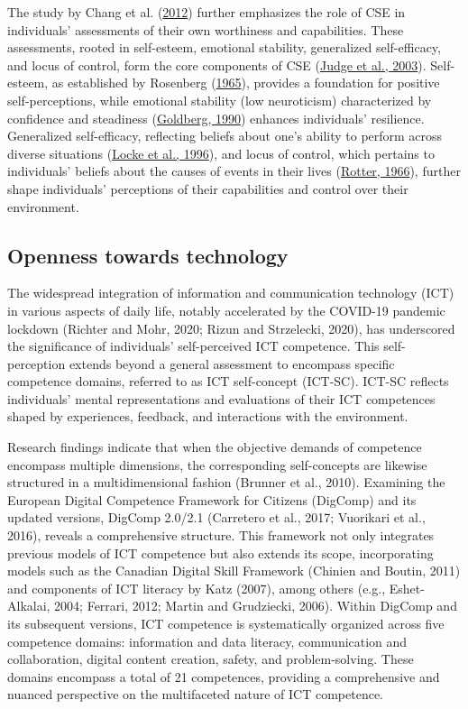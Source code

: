 \documentclass[
  12pt,
  a4paper,
  twoside]{article}
\begin{document}
The study by Chang et al. (\protect\hyperlink{ref-chang2012}{2012}) further emphasizes the role of CSE in individuals' assessments of their own worthiness and capabilities. These assessments, rooted in self-esteem, emotional stability, generalized self-efficacy, and locus of control, form the core components of CSE (\protect\hyperlink{ref-judge2003}{Judge et al., 2003}). Self-esteem, as established by Rosenberg (\protect\hyperlink{ref-rosenberg1965}{1965}), provides a foundation for positive self-perceptions, while emotional stability (low neuroticism) characterized by confidence and steadiness (\protect\hyperlink{ref-goldberg1990}{Goldberg, 1990}) enhances individuals' resilience. Generalized self-efficacy, reflecting beliefs about one's ability to perform across diverse situations (\protect\hyperlink{ref-locke1996}{Locke et al., 1996}), and locus of control, which pertains to individuals' beliefs about the causes of events in their lives (\protect\hyperlink{ref-rotter1966}{Rotter, 1966}), further shape individuals' perceptions of their capabilities and control over their environment.

\hypertarget{openness-towards-technology}{%
\subsection{Openness towards technology}\label{openness-towards-technology}}

The widespread integration of information and communication technology (ICT) in various aspects of daily life, notably accelerated by the COVID-19 pandemic lockdown (Richter and Mohr, 2020; Rizun and Strzelecki, 2020), has underscored the significance of individuals' self-perceived ICT competence. This self-perception extends beyond a general assessment to encompass specific competence domains, referred to as ICT self-concept (ICT-SC). ICT-SC reflects individuals' mental representations and evaluations of their ICT competences shaped by experiences, feedback, and interactions with the environment.

Research findings indicate that when the objective demands of competence encompass multiple dimensions, the corresponding self-concepts are likewise structured in a multidimensional fashion (Brunner et al., 2010). Examining the European Digital Competence Framework for Citizens (DigComp) and its updated versions, DigComp 2.0/2.1 (Carretero et al., 2017; Vuorikari et al., 2016), reveals a comprehensive structure. This framework not only integrates previous models of ICT competence but also extends its scope, incorporating models such as the Canadian Digital Skill Framework (Chinien and Boutin, 2011) and components of ICT literacy by Katz (2007), among others (e.g., Eshet-Alkalai, 2004; Ferrari, 2012; Martin and Grudziecki, 2006).
Within DigComp and its subsequent versions, ICT competence is systematically organized across five competence domains: information and data literacy, communication and collaboration, digital content creation, safety, and problem-solving. These domains encompass a total of 21 competences, providing a comprehensive and nuanced perspective on the multifaceted nature of ICT competence.
\end{document}
